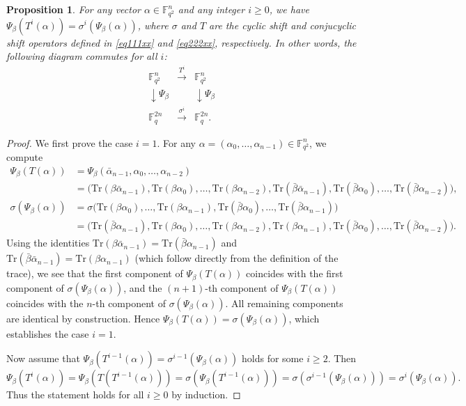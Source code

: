 \documentclass{aims}
\numberwithin{equation}{section}
\newtheorem{proposition}[theorem]{Proposition}
\theoremstyle{definition}
\newcommand{\F}{\mathbb{F}}
\newcommand{\Tr}{\mathrm{Tr}}
\begin{document}
\begin{proposition}\label{prop:commute}
	For any vector $\alpha \in \F_{q^2}^n$ and any integer $i \ge 0$, we have $\Psi_\beta(T^i(\alpha)) = \sigma^i(\Psi_\beta(\alpha))$, where $\sigma$ and $T$ are the cyclic shift and conjucyclic shift operators defined in \eqref{eq111xx} and \eqref{eq222xx}, respectively. In other words, the following diagram commutes for all $i$:
	\[
	\begin{array}{ccc}
		\F_{q^2}^n & \xrightarrow{T^i} & \F_{q^2}^n\\
		\downarrow\Psi_\beta && \downarrow\Psi_\beta\\
		\F_q^{2n} & \xrightarrow{\sigma^i} & \F_q^{2n}.
	\end{array}
	\]
\end{proposition}
\begin{proof}
	We first prove the case $i=1$. For any $\alpha = (\alpha_0, \ldots, \alpha_{n-1}) \in \F_{q^2}^n$, we compute
	\[
	\begin{aligned}
		\Psi_\beta(T(\alpha)) &= \Psi_\beta(\bar{\alpha}_{n-1}, \alpha_0, \ldots, \alpha_{n-2}) \\
		&= \bigl( \Tr(\beta\bar{\alpha}_{n-1}), \Tr(\beta\alpha_0), \ldots, \Tr(\beta\alpha_{n-2}), 
	\Tr(\bar{\beta}\bar{\alpha}_{n-1}), \Tr(\bar{\beta}\alpha_0), \ldots, \Tr(\bar{\beta}\alpha_{n-2}) \bigr),
	\end{aligned}
	\]
	\[
	\begin{aligned}
		\sigma(\Psi_\beta(\alpha)) &= \sigma\bigl( \Tr(\beta\alpha_0), \ldots, \Tr(\beta\alpha_{n-1}), \Tr(\bar{\beta}\alpha_0), \ldots, \Tr(\bar{\beta}\alpha_{n-1}) \bigr) \\
		&= \bigl( \Tr(\bar{\beta}\alpha_{n-1}), \Tr(\beta\alpha_0), \ldots, \Tr(\beta\alpha_{n-2}),  \Tr(\beta\alpha_{n-1}), \Tr(\bar{\beta}\alpha_0), \ldots, \Tr(\bar{\beta}\alpha_{n-2}) \bigr).
	\end{aligned}
	\]
	Using the identities $\Tr(\beta\bar{\alpha}_{n-1}) = \Tr(\bar{\beta}\alpha_{n-1})$ and $\Tr(\bar{\beta}\bar{\alpha}_{n-1}) = \Tr(\beta\alpha_{n-1})$ (which follow directly from the definition of the trace), we see that the first component of $\Psi_\beta(T(\alpha))$ coincides with the first component of $\sigma(\Psi_\beta(\alpha))$, and the $(n+1)$-th component of $\Psi_\beta(T(\alpha))$ coincides with the $n$-th component of $\sigma(\Psi_\beta(\alpha))$. All remaining components are identical by construction. Hence $\Psi_\beta(T(\alpha)) = \sigma(\Psi_\beta(\alpha))$, which establishes the case $i=1$.
	
	Now assume that $\Psi_\beta(T^{i-1}(\alpha)) = \sigma^{i-1}(\Psi_\beta(\alpha))$ holds for some $i \ge 2$. Then
	\[
	\Psi_\beta(T^i(\alpha)) = \Psi_\beta(T(T^{i-1}(\alpha))) = \sigma(\Psi_\beta(T^{i-1}(\alpha))) = \sigma(\sigma^{i-1}(\Psi_\beta(\alpha))) = \sigma^i(\Psi_\beta(\alpha)).
	\]
	Thus the statement holds for all $i \ge 0$ by induction.
\end{proof}
\end{document}
